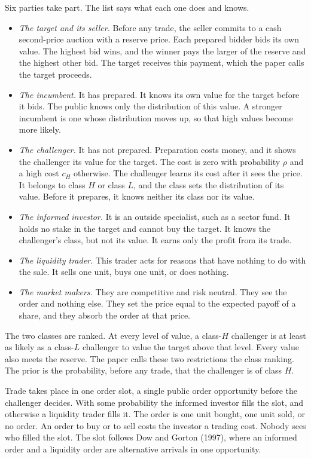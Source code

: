 Six parties take part. The list says what each one does and knows.
\begin{itemize}
\item \emph{The target and its seller.} Before any trade, the seller commits to a cash second-price auction with a reserve price. Each prepared bidder bids its own value. The highest bid wins, and the winner pays the larger of the reserve and the highest other bid. The target receives this payment, which the paper calls the target proceeds.
\item \emph{The incumbent.} It has prepared. It knows its own value for the target before it bids. The public knows only the distribution of this value. A stronger incumbent is one whose distribution moves up, so that high values become more likely.
\item \emph{The challenger.} It has not prepared. Preparation costs money, and it shows the challenger its value for the target. The cost is zero with probability \(\rho\) and a high cost \(c_H\) otherwise. The challenger learns its cost after it sees the price. It belongs to class \(H\) or class \(L\), and the class sets the distribution of its value. Before it prepares, it knows neither its class nor its value.
\item \emph{The informed investor.} It is an outside specialist, such as a sector fund. It holds no stake in the target and cannot buy the target. It knows the challenger's class, but not its value. It earns only the profit from its trade.
\item \emph{The liquidity trader.} This trader acts for reasons that have nothing to do with the sale. It sells one unit, buys one unit, or does nothing.
\item \emph{The market makers.} They are competitive and risk neutral. They see the order and nothing else. They set the price equal to the expected payoff of a share, and they absorb the order at that price.
\end{itemize}

The two classes are ranked. At every level of value, a class-\(H\) challenger is at least as likely as a class-\(L\) challenger to value the target above that level. Every value also meets the reserve. The paper calls these two restrictions the class ranking. The prior is the probability, before any trade, that the challenger is of class \(H\).

Trade takes place in one order slot, a single public order opportunity before the challenger decides. With some probability the informed investor fills the slot, and otherwise a liquidity trader fills it. The order is one unit bought, one unit sold, or no order. An order to buy or to sell costs the investor a trading cost. Nobody sees who filled the slot. The slot follows Dow and Gorton (1997), where an informed order and a liquidity order are alternative arrivals in one opportunity.

